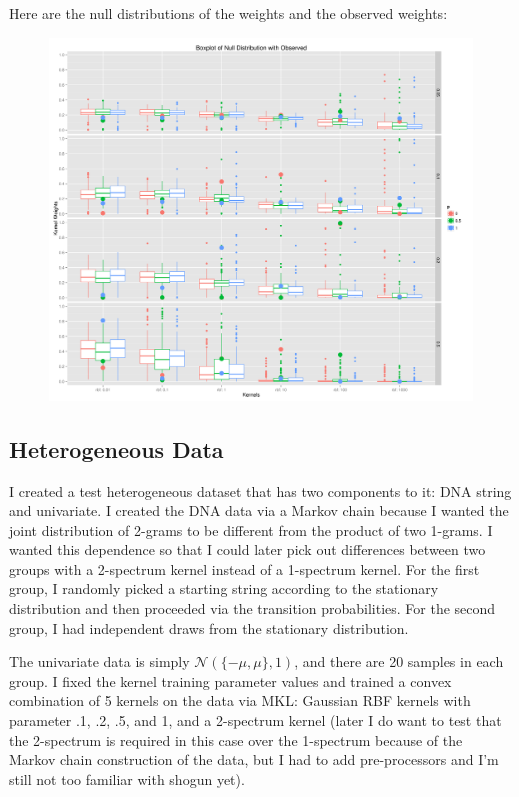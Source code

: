Here are the null distributions of the weights and the observed weights:
\begin{figure}[!ht]
  \centering
  \includegraphics[scale=.3]{vectorial_weights.png}  
\end{figure}

\subsection{Heterogeneous Data}
I created a test
heterogeneous dataset that has two components to it: DNA string and
univariate.  I created the DNA data via a Markov chain because I
wanted the joint distribution of 2-grams to be different from the
product of two 1-grams.  I wanted this dependence so that I could
later pick out differences between two groups with a 2-spectrum kernel
instead of a 1-spectrum kernel.  For the first group, I randomly
picked a starting string according to the stationary distribution and
then proceeded via the transition probabilities.  For the second
group, I had independent draws from the stationary distribution.

The univariate data is simply $\mathcal{N}(\{-\mu, \mu\}, 1)$, and there are 20
samples in each group.  I fixed the kernel training parameter values
and trained a convex combination of 5 kernels on the data via MKL:
Gaussian RBF kernels with parameter .1, .2, .5, and 1, and a
2-spectrum kernel (later I do want to test that the 2-spectrum is
required in this case over the 1-spectrum because of the Markov chain
construction of the data, but I had to add pre-processors and I'm
still not too familiar with shogun yet).

